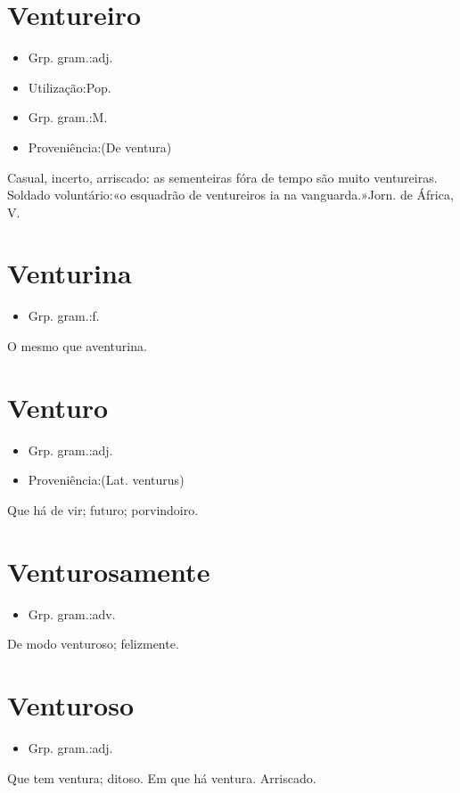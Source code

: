 \documentclass{article}
\begin{document}
\section{Ventureiro}
\begin{itemize}
\item {Grp. gram.:adj.}
\end{itemize}
\begin{itemize}
\item {Utilização:Pop.}
\end{itemize}
\begin{itemize}
\item {Grp. gram.:M.}
\end{itemize}
\begin{itemize}
\item {Proveniência:(De \textunderscore ventura\textunderscore )}
\end{itemize}
Casual, incerto, arriscado: \textunderscore as sementeiras fóra de tempo são muito ventureiras\textunderscore .
Soldado voluntário:«\textunderscore o esquadrão de ventureiros ia na vanguarda.\textunderscore »\textunderscore Jorn. de África\textunderscore , V.
\section{Venturina}
\begin{itemize}
\item {Grp. gram.:f.}
\end{itemize}
O mesmo que \textunderscore aventurina\textunderscore .
\section{Venturo}
\begin{itemize}
\item {Grp. gram.:adj.}
\end{itemize}
\begin{itemize}
\item {Proveniência:(Lat. \textunderscore venturus\textunderscore )}
\end{itemize}
Que há de vir; futuro; porvindoiro.
\section{Venturosamente}
\begin{itemize}
\item {Grp. gram.:adv.}
\end{itemize}
De modo venturoso; felizmente.
\section{Venturoso}
\begin{itemize}
\item {Grp. gram.:adj.}
\end{itemize}
Que tem ventura; ditoso.
Em que há ventura.
Arriscado.
\end{document}
